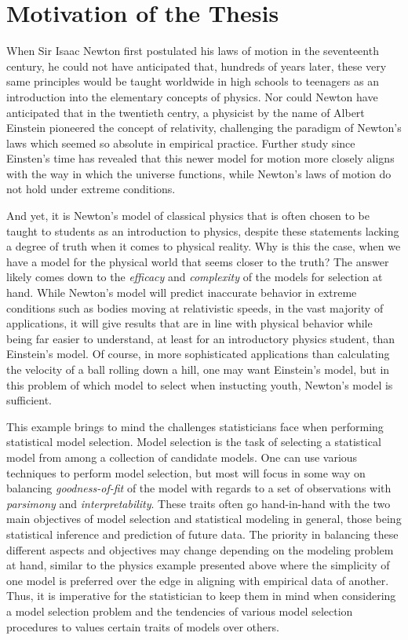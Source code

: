 \doublespace
{}
		\section{Motivation of the Thesis}
		When Sir Isaac Newton first postulated his laws of motion in the seventeenth century, he could not have anticipated that, hundreds of years later, these very same principles would
		be taught worldwide in high schools to teenagers as an introduction into the elementary concepts of physics. Nor could Newton have anticipated that in the twentieth centry, a
		physicist by the name of Albert Einstein pioneered the concept of relativity, challenging the paradigm of Newton's laws which seemed so absolute in empirical practice. Further study
		since Einsten's time has revealed that this newer model for motion more closely aligns with the way in which the universe functions, while Newton's laws of motion do not hold
		under extreme conditions.

		And yet, it is Newton's model of classical physics that is often chosen to be taught to students as an introduction to physics, despite these statements lacking a degree of truth when
		it comes to physical reality. Why is this the case, when we have a model for the physical world that seems closer to the truth? The answer likely comes down to the \textit{efficacy} and
		\textit{complexity} of the models for selection at hand. While Newton's model will predict inaccurate behavior in extreme conditions such as bodies moving at relativistic speeds, in the
		vast majority of applications, it will give results that are in line with physical behavior while being far easier to understand, at least for an introductory physics student, than 
		Einstein's model. Of course, in more sophisticated applications than calculating the velocity of a ball rolling down a hill, one may want Einstein's model, but in this problem of 
		which model to select when instucting youth, Newton's model is sufficient.

		This example brings to mind the challenges statisticians face when performing statistical model selection. Model selection is the task of selecting a statistical model from among a
		collection of candidate models. One can use various techniques to perform model selection, but most will focus in some way on balancing \textit{goodness-of-fit} of the model with
		regards to a set of observations with \textit{parsimony} and \textit{interpretability}. These traits often go hand-in-hand with the two main objectives of model selection and 
		statistical modeling in general, those being statistical inference and prediction of future data. The priority in balancing these different aspects and objectives may change depending
		on the modeling problem at hand, similar to the physics example presented above where the simplicity of one model is preferred over the edge in aligning with empirical data of another.
		Thus, it is imperative for the statistician to keep them in mind when considering a model selection problem and the tendencies of various model selection procedures to values certain
		traits of models over others.

